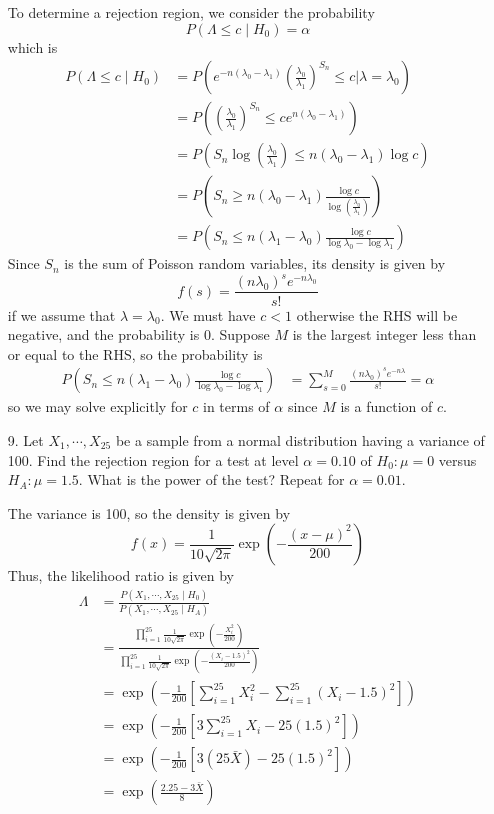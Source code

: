 \documentclass{article}
\begin{document}
\begin{itemize}
\begin{soln}
			To determine a rejection region, we consider the probability \[P(\Lambda\le c\mid H_0)=\alpha\] which is
			\begin{align*}
				P(\Lambda\le c\mid H_0) &= P\left( e^{-n(\lambda_0-\lambda_1)} \left( \frac{\lambda_0}{\lambda_1} \right)^{S_n} \le c\bigg\vert \lambda=\lambda_0 \right) \\
				&= P\left( \left( \frac{\lambda_0}{\lambda_1} \right)^{S_n}\le ce^{n(\lambda_0-\lambda_1)} \right) \\
				&= P\left( S_n\log \left( \frac{\lambda_0}{\lambda_1}\right)\le n(\lambda_0-\lambda_1) \log c  \right) \\
				&= P\left( S_n\ge n(\lambda_0-\lambda_1)\frac{\log c}{\log \left( \frac{\lambda_0}{\lambda_1} \right)} \right) \\
				&= P\left( S_n\le n(\lambda_1-\lambda_0) \frac{\log c}{\log \lambda_0-\log \lambda_1} \right)	
			\end{align*} Since $S_n$ is the sum of Poisson random variables, its density is given by \[f(s) = \frac{(n\lambda_0)^s e^{-n\lambda_0}}{s!}\] if we assume that $\lambda=\lambda_0.$ We must have $c<1$ otherwise the RHS will be negative, and the probability is 0. Suppose $M$ is the largest integer less than or equal to the RHS, so the probability is 
			\begin{align*}
				P\left( S_n\le n(\lambda_1-\lambda_0) \frac{\log c}{\log \lambda_0-\log \lambda_1} \right) &= \sum_{s=0}^{M} \frac{(n\lambda_0)^s e^{-n\lambda}}{s!}=\alpha
			\end{align*} so we may solve explicitly for $c$ in terms of $\alpha$ since $M$ is a function of $c.$ 

		\end{soln}

		\newpage
	\item[9.] Let $X_1,\cdots, X_{25}$ be a sample from a normal distribution having a variance of 100. Find the rejection region for a test at level $\alpha=0.10$ of $H_0:\mu=0$ versus $H_A: \mu=1.5.$ What is the power of the test? Repeat for $\alpha=0.01.$
		\begin{soln}
			The variance is 100, so the density is given by \[f(x) = \frac{1}{10\sqrt{2\pi}}\exp\left( -\frac{(x-\mu)^2}{200} \right)\] Thus, the likelihood ratio is given by
			\begin{align*}
				\Lambda &= \frac{P(X_1, \cdots, X_{25}\mid H_0)}{P(X_1, \cdots, X_{25}\mid H_A)} \\
				&= \frac{\displaystyle \prod_{i=1}^{25}\frac{1}{10\sqrt{2\pi}}\exp\left( -\frac{X_i^2}{200} \right)}{\displaystyle \prod_{i=1}^{25} \frac{1}{10\sqrt{2\pi}}\exp\left( -\frac{(X_i-1.5)^2}{200} \right)} \\
				&= \exp\left( -\frac{1}{200}\left[ \sum_{i=1}^{25}X_i^2 - \sum_{i=1}^{25}(X_i-1.5)^2 \right] \right) \\
				&= \exp\left( -\frac{1}{200}\left[ 3\sum_{i=1}^{25}X_i - 25(1.5)^2 \right] \right) \\
				&= \exp\left( -\frac{1}{200}\left[ 3(25\bar{X})-25(1.5)^2 \right] \right) \\
				&= \exp\left( \frac{2.25-3\bar{X}}{8} \right)
			\end{align*}


\end{soln}
\end{itemize}
\end{document}
